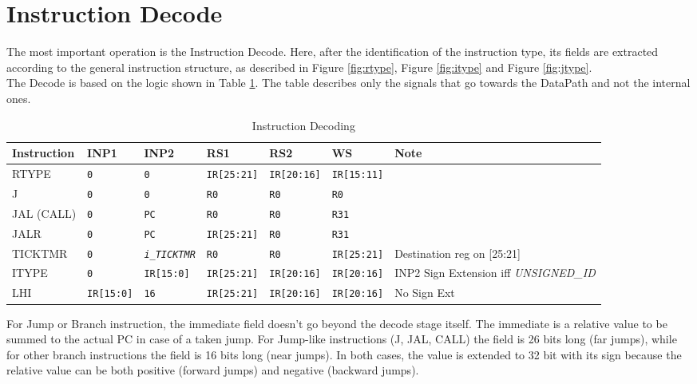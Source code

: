 \section{Instruction Decode}

The most important operation is the Instruction Decode. Here, after the identification of the instruction type, its fields are extracted according to the general instruction structure, as described in Figure \ref{fig:rtype}, Figure \ref{fig:itype} and Figure \ref{fig:jtype}.\\

The Decode is based on the logic shown in Table \ref{table:decode_instr}. The table describes only the signals that go towards the DataPath and not the internal ones.

\begin{table}[H]
    \centering
    \begin{tabularx}{\textwidth}{|l|l|l|l|l|l|X|}
        \hline
        \textbf{Instruction} & INP1 & INP2 & RS1 & RS2 & WS & Note\\
        \hline
        RTYPE & \texttt{0} & \texttt{0} & \texttt{IR[25:21]} & \texttt{IR[20:16]} & \texttt{IR[15:11]} & \\
        \hline
        J & \texttt{0} & \texttt{0} & \texttt{R0} & \texttt{R0} & \texttt{R0} & \\
        \hline
        JAL (CALL) & \texttt{0} & \texttt{PC} & \texttt{R0} & \texttt{R0} & \texttt{R31} & \\
        \hline
        JALR & \texttt{0} & \texttt{PC} & \texttt{IR[25:21]} & \texttt{R0} & \texttt{R31} & \\
        \hline
        TICKTMR & \texttt{0} & \texttt{\emph{i\_TICKTMR}} & \texttt{R0} & \texttt{R0} & \texttt{IR[25:21]} & Destination reg on [25:21]\\
        \hline
        ITYPE & \texttt{0} & \texttt{IR[15:0]} & \texttt{IR[25:21]} & \texttt{IR[20:16]} & \texttt{IR[20:16]} & INP2 Sign Extension iff \emph{UNSIGNED\_ID}\\
        \hline
        LHI & \texttt{IR[15:0]} & \texttt{16} & \texttt{IR[25:21]} & \texttt{IR[20:16]} & \texttt{IR[20:16]} & No Sign Ext\\
        \hline
    \end{tabularx}
    \caption{Instruction Decoding}
    \label{table:decode_instr}
\end{table}

For Jump or Branch instruction, the immediate field doesn't go beyond the decode stage itself. The immediate is a relative value to be summed to the actual PC in case of a taken jump. For Jump-like instructions (J, JAL, CALL) the field is 26 bits long (far jumps), while for other branch instructions the field is 16 bits long (near jumps). In both cases, the value is extended to 32 bit with its sign because the relative value can be both positive (forward jumps) and negative (backward jumps).

